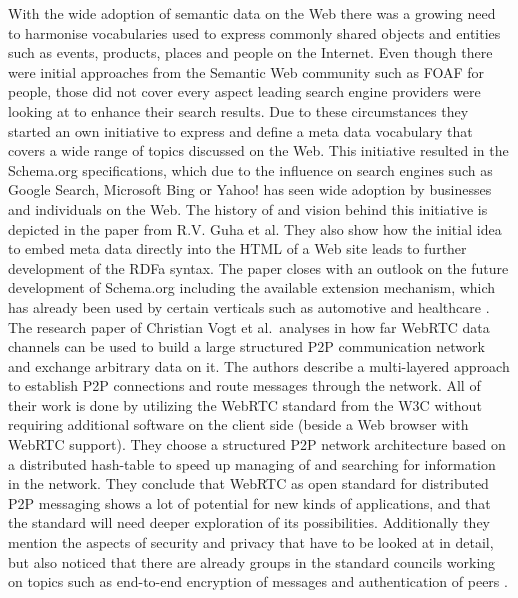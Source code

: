 With the wide adoption of semantic data on the Web there was a growing need to harmonise vocabularies used to express commonly shared objects and entities such as events, products, places and people on the Internet. Even though there were initial approaches from the Semantic Web community such as \gls{FOAF} for people, those did not cover every aspect leading search engine providers were looking at to enhance their search results. Due to these circumstances they started an own initiative to express and define a meta data vocabulary that covers a wide range of topics discussed on the Web. This initiative resulted in the Schema.org specifications, which due to the influence on search engines such as Google Search, Microsoft Bing or Yahoo! has seen wide adoption by businesses and individuals on the Web. The history of and vision behind this initiative is depicted in the paper from R.V. Guha et al. They also show how the initial idea to embed meta data directly into the \gls{HTML} of a Web site leads to further development of the \gls{RDFa} syntax. The paper closes with an outlook on the future development of Schema.org including the available extension mechanism, which has already been used by certain verticals such as automotive and healthcare \citep{guha2016schema}. \\

The research paper of Christian Vogt et al.\ analyses in how far \gls{WebRTC} data channels can be used to build a large structured \gls{P2P} communication network and exchange arbitrary data on it. The authors describe a multi-layered approach to establish \gls{P2P} connections and route messages through the network. All of their work is done by utilizing the \gls{WebRTC} standard from the \gls{W3C} without requiring additional software on the client side (beside a Web browser with \gls{WebRTC} support). They choose a structured \gls{P2P} network architecture based on a distributed hash-table to speed up managing of and searching for information in the network. They conclude that \gls{WebRTC} as open standard for distributed \gls{P2P} messaging shows a lot of potential for new kinds of applications, and that the standard will need deeper exploration of its possibilities. Additionally they mention the aspects of security and privacy that have to be looked at in detail, but also noticed that there are already groups in the standard councils working on topics such as end-to-end encryption of messages and authentication of peers \citep{vogt2013leveraging}. \\

